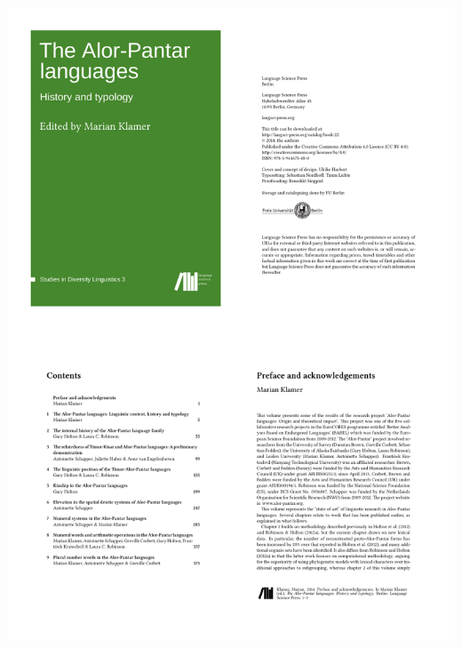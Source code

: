 \begin{frame}
\begin{minipage}[c]{0.49\textwidth}
\includegraphics[width=0.80\linewidth]{../../texfiles-beamer/tex-material/WissArb-latex/LaTeX_book_2.pdf}
\end{minipage}
%         

\end{frame}


